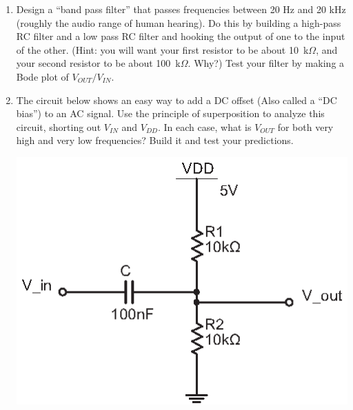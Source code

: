 \begin{enumerate}[wide]
\item Design a ``band pass filter'' that passes frequencies between 20 Hz and 20 kHz (roughly the audio range of human hearing).  Do this by building a high-pass RC filter and a low pass RC filter and hooking the output of one to the input of the other.  (Hint: you will want your first resistor to be about 10~k$\Omega$, and your second resistor to be about 100~k$\Omega$.  Why?)   Test your filter by making a Bode plot of $V_{OUT}/V_{IN}$.



\item The circuit below shows an easy way to add a DC offset (Also called a ``DC bias'') to an AC signal.  Use the principle of superposition to analyze this circuit, shorting out $V_{IN}$ and $V_{DD}$.  In each case, what is $V_{OUT}$ for both very high and very low frequencies?  Build it and test your predictions.
\begin{center}
\includegraphics{filters/DC_biasing.eps}
\end{center}


\end{enumerate}

